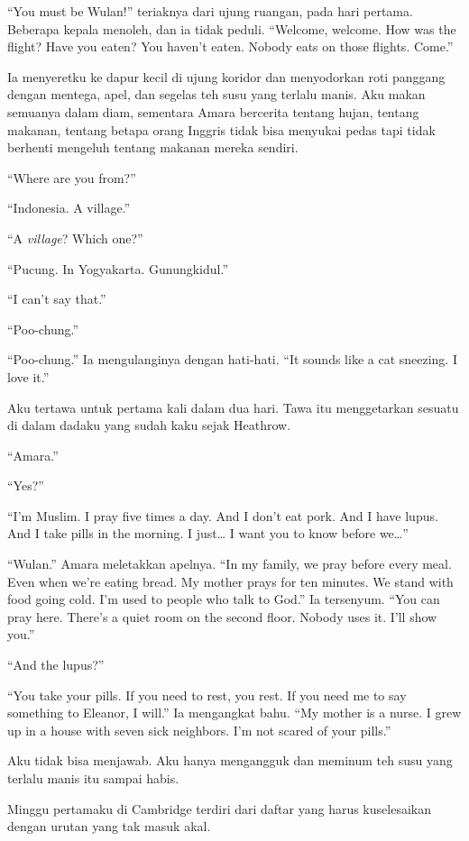 \documentclass[11pt,twoside,openany]{book}
\makeatletter
\newcommand{\scenebreak}{\par\vspace{0.9em}{\centering\textsc{*\hspace{0.7em}*\hspace{0.7em}*}\par}\vspace{0.9em}\@afterindentfalse\@afterheading}
\makeatother
\begin{document}
``You must be Wulan!'' teriaknya dari ujung ruangan, pada hari pertama. Beberapa kepala menoleh, dan ia tidak peduli. ``Welcome, welcome. How was the flight? Have you eaten? You haven't eaten. Nobody eats on those flights. Come.''

Ia menyeretku ke dapur kecil di ujung koridor dan menyodorkan roti panggang dengan mentega, apel, dan segelas teh susu yang terlalu manis. Aku makan semuanya dalam diam, sementara Amara bercerita tentang hujan, tentang makanan, tentang betapa orang Inggris tidak bisa menyukai pedas tapi tidak berhenti mengeluh tentang makanan mereka sendiri.

``Where are you from?''

``Indonesia. A village.''

``A \emph{village}? Which one?''

``Pucung. In Yogyakarta. Gunungkidul.''

``I can't say that.''

``Poo-chung.''

``Poo-chung.'' Ia mengulanginya dengan hati-hati. ``It sounds like a cat sneezing. I love it.''

Aku tertawa untuk pertama kali dalam dua hari. Tawa itu menggetarkan sesuatu di dalam dadaku yang sudah kaku sejak Heathrow.

``Amara.''

``Yes?''

``I'm Muslim. I pray five times a day. And I don't eat pork. And I have lupus. And I take pills in the morning. I just\ldots{} I want you to know before we\ldots{}''

``Wulan.'' Amara meletakkan apelnya. ``In my family, we pray before every meal. Even when we're eating bread. My mother prays for ten minutes. We stand with food going cold. I'm used to people who talk to God.'' Ia tersenyum. ``You can pray here. There's a quiet room on the second floor. Nobody uses it. I'll show you.''

``And the lupus?''

``You take your pills. If you need to rest, you rest. If you need me to say something to Eleanor, I will.'' Ia mengangkat bahu. ``My mother is a nurse. I grew up in a house with seven sick neighbors. I'm not scared of your pills.''

Aku tidak bisa menjawab. Aku hanya mengangguk dan meminum teh susu yang terlalu manis itu sampai habis.

\scenebreak
Minggu pertamaku di Cambridge terdiri dari daftar yang harus kuselesaikan dengan urutan yang tak masuk akal.
\end{document}
